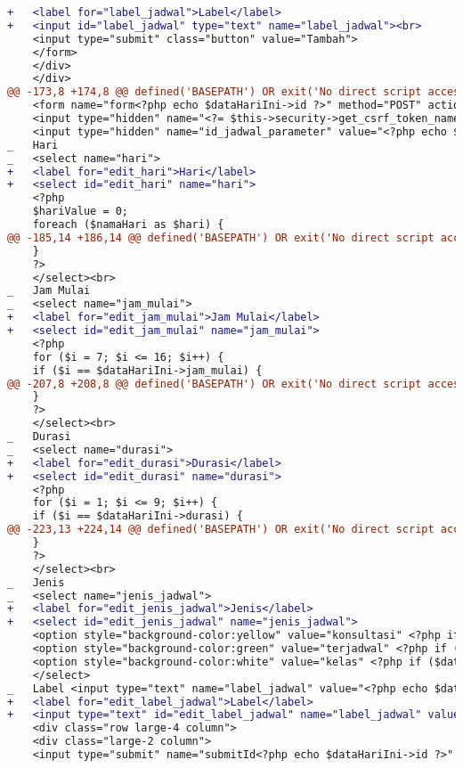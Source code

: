 \begin{itemize}
\begin{lstlisting}[frame=single, label={lst:perbaikan_1.3.1_label_masukan_entri_jadwal_dosen}, language=diff, caption=Perbaikan Kriteria Sukses 1.3.1 pada Kolom Masukan di Halaman Entri Jadwal Dosen]
+   <label for="label_jadwal">Label</label>
+   <input id="label_jadwal" type="text" name="label_jadwal"><br>
    <input type="submit" class="button" value="Tambah">
    </form>
    </div>
    </div>
@@ -173,8 +174,8 @@ defined('BASEPATH') OR exit('No direct script access allowed');
    <form name="form<?php echo $dataHariIni->id ?>" method="POST" action="/EntriJadwalDosen/update/<?php echo $dataHariIni->id ?>">
    <input type="hidden" name="<?= $this->security->get_csrf_token_name() ?>" value="<?= $this->security->get_csrf_hash() ?>" />
    <input type="hidden" name="id_jadwal_parameter" value="<?php echo $dataHariIni->id ?>"> </a> <br>
_   Hari 
_   <select name="hari"> 
+   <label for="edit_hari">Hari</label>
+   <select id="edit_hari" name="hari"> 
    <?php
    $hariValue = 0;
    foreach ($namaHari as $hari) {
@@ -185,14 +186,14 @@ defined('BASEPATH') OR exit('No direct script access allowed');
    }
    ?>
    </select><br>
_   Jam Mulai
_   <select name="jam_mulai"> 
+   <label for="edit_jam_mulai">Jam Mulai</label>
+   <select id="edit_jam_mulai" name="jam_mulai"> 
    <?php
    for ($i = 7; $i <= 16; $i++) {
    if ($i == $dataHariIni->jam_mulai) {
@@ -207,8 +208,8 @@ defined('BASEPATH') OR exit('No direct script access allowed');
    }
    ?>
    </select><br>
_   Durasi
_   <select name="durasi"> 
+   <label for="edit_durasi">Durasi</label>
+   <select id="edit_durasi" name="durasi"> 
    <?php
    for ($i = 1; $i <= 9; $i++) {
    if ($i == $dataHariIni->durasi) {
@@ -223,13 +224,14 @@ defined('BASEPATH') OR exit('No direct script access allowed');
    }
    ?>
    </select><br>
_   Jenis  
_   <select name="jenis_jadwal"> 
+   <label for="edit_jenis_jadwal">Jenis</label>
+   <select id="edit_jenis_jadwal" name="jenis_jadwal"> 
    <option style="background-color:yellow" value="konsultasi" <?php if ($dataHariIni->jenis == 'konsultasi') echo "selected"; ?> > Konsultasi </option>
    <option style="background-color:green" value="terjadwal" <?php if ($dataHariIni->jenis == 'terjadwal') echo "selected"; ?>> Terjadwal</option>
    <option style="background-color:white" value="kelas" <?php if ($dataHariIni->jenis == 'kelas') echo "selected"; ?>> Kelas </option>
    </select>
_   Label <input type="text" name="label_jadwal" value="<?php echo $dataHariIni->label; ?>"><br> 
+   <label for="edit_label_jadwal">Label</label>
+   <input type="text" id="edit_label_jadwal" name="label_jadwal" value="<?php echo $dataHariIni->label; ?>"><br> 
    <div class="row large-4 column">
    <div class="large-2 column">
    <input type="submit" name="submitId<?php echo $dataHariIni->id ?>" class="button" value="Save  ">
\end{lstlisting}
\end{itemize}

